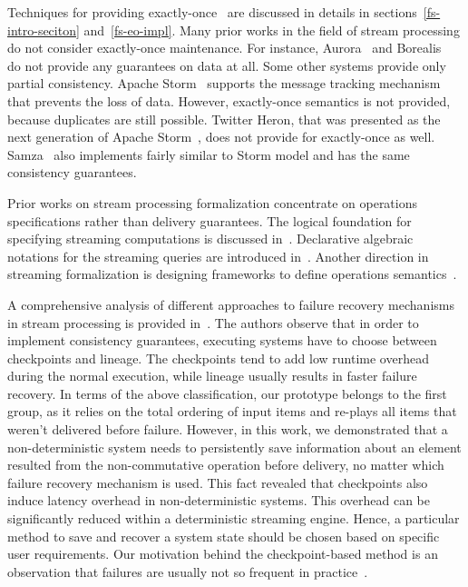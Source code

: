 
\label {fs-related-seciton}

Techniques for providing exactly-once~\cite{Carbone:2017:SMA:3137765.3137777, Akidau:2013:MFS:2536222.2536229, Zaharia:2012:DSE:2342763.2342773} are discussed   in details in sections~\ref{fs-intro-seciton} and~\ref{fs-eo-impl}. Many prior works in the field of stream processing do not consider exactly-once maintenance. 
For instance, Aurora~\cite{Abadi:2003:ANM:950481.950485} and Borealis~\cite{abadi2005design} do not provide any guarantees on data at all. Some other systems provide only partial consistency. Apache Storm~\cite{apache:storm} supports the message tracking mechanism that prevents the loss of data. 
However, exactly-once semantics is not provided, because duplicates are still possible. Twitter Heron, that was presented as the next generation of Apache Storm~\cite{Kulkarni:2015:THS:2723372.2742788}, does not provide for exactly-once as well. 
Samza~\cite{Noghabi:2017:SSS:3137765.3137770} also implements fairly similar to Storm model and has the same consistency guarantees.

Prior works on stream processing formalization concentrate on operations specifications rather than delivery guarantees. The logical foundation for specifying streaming computations is discussed in~\cite{alur2018interfaces}. Declarative algebraic notations for the streaming queries are introduced in~\cite{halle2014formalization}. Another direction in streaming formalization is designing frameworks to define operations semantics~\cite{beck2018lars}.

A comprehensive analysis of different approaches to failure recovery mechanisms in stream processing is provided in~\cite{Wang:2019:LSF:3341301.3359653}.  The authors observe that in order to implement consistency guarantees, executing systems have to choose between checkpoints and lineage. The checkpoints tend to add low runtime overhead during the normal execution, while lineage usually results in faster failure recovery. In terms of the above classification, our prototype belongs to the first group, as it relies on the total ordering of input items and re-plays all items that weren't delivered before failure. However, in this work, we demonstrated that a non-deterministic system needs to persistently save information about an element resulted from the non-commutative operation before delivery, no matter which failure recovery mechanism is used. This fact revealed that checkpoints also induce latency overhead in non-deterministic systems. This overhead can be significantly reduced within a deterministic streaming engine. Hence, a particular method to save and recover a system state should be chosen based on specific user requirements. Our motivation behind the checkpoint-based method is an observation that failures are usually not so frequent in practice~\cite{Akidau:2013:MFS:2536222.2536229}.

